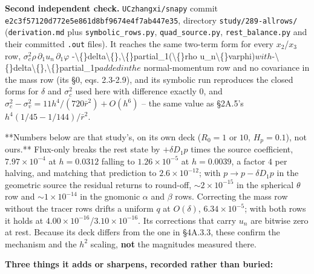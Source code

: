 \documentclass[11pt,a4paper]{article}
\begin{document}
\textbf{Second independent check.} \texttt{UCzhangxi/snapy} commit
\texttt{e2c3f57120d772e5e861d8bf9674e4f7ab447e35}, directory \texttt{study/289-allrows/}
(\texttt{derivation.md} plus \texttt{symbolic\_rows.py}, \texttt{quad\_source.py}, \texttt{rest\_balance.py}
and their committed \texttt{.out} files). It reaches the same two-term form for every
$x_2$/$x_3$ row, $\sigma_c^2\rho\,\partial_1u_n\,\partial_1\varphi$
-\textbackslash\{\}delta\textbackslash\{\},\textbackslash\{\}partial\_1(\textbackslash\{\}rho u\_n\textbackslash\{\}varphi)$ with $-\textbackslash\{\}delta\textbackslash\{\},\textbackslash\{\}partial\_1p$ added in the$
normal-momentum row and no covariance in the mass row (its §0, eqs. 2.3-2.9),
and its symbolic run reproduces the closed forms for $\delta$ and $\sigma_c^2$
used here with difference exactly $0$, and
$\sigma_c^2-\sigma_v^2=11h^4/(720\bar r^2)+O(h^6)$ -- the same value as §2A.5's
$h^4(1/45-1/144)/\bar r^2$.

**Numbers below are that study's, on its own deck ($R_0=1$ or $10$,
$H_p=0.1$), not ours.** Flux-only breaks the rest state by
$+\delta D_1p$ times the source coefficient, $7.97\times10^{-4}$ at
$h=0.0312$ falling to $1.26\times10^{-5}$ at $h=0.0039$, a factor $4$ per
halving, and matching that prediction to $2.6\times10^{-12}$; with
$p\to p-\delta D_1p$ in the geometric source the residual returns to round-off,
$\sim\!2\times10^{-15}$ in the spherical $\theta$ row and
$\sim\!1\times10^{-14}$ in the gnomonic $\alpha$ and $\beta$ rows. Correcting
the mass row without the tracer rows drifts a uniform $q$ at $O(\delta)$,
$6.34\times10^{-5}$; with both rows it holds at
$4.00\times10^{-16}$/$3.10\times10^{-16}$. Its corrections that carry $u_n$ are
bitwise zero at rest. Because its deck differs from the one in §4A.3.3, these
confirm the mechanism and the $h^2$ scaling, \textbf{not} the magnitudes measured
there.

\textbf{Three things it adds or sharpens, recorded rather than buried:}
\end{document}
